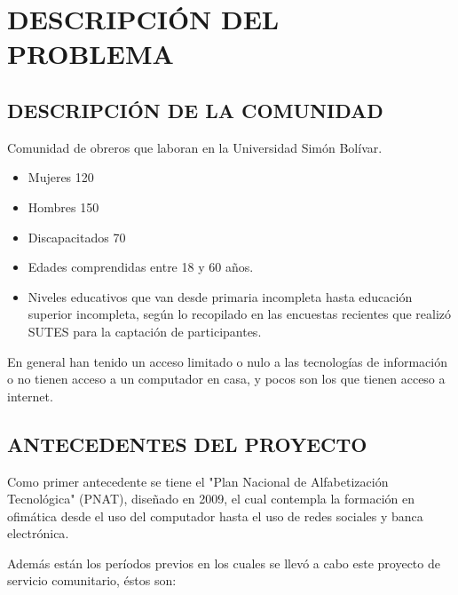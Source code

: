 	\chapter{DESCRIPCIÓN DEL PROBLEMA}
    
		\section{DESCRIPCIÓN DE LA COMUNIDAD}
			Comunidad de obreros que laboran en la Universidad Simón Bolívar. \cite{planSC}
            \begin{itemize}
                \item Mujeres 120
                \item Hombres 150
                \item Discapacitados 70
                \item Edades comprendidas entre 18 y 60 años. 
                \item Niveles educativos que van desde primaria incompleta hasta educación superior incompleta, según lo recopilado en las encuestas recientes que realizó SUTES para la captación de participantes.
            \end{itemize}
            
            En general han tenido un acceso limitado o nulo a las tecnologías de información o no tienen acceso a un computador en casa, y pocos son los que tienen acceso a internet.
            
		\section{ANTECEDENTES DEL PROYECTO}
            Como primer antecedente se tiene el "Plan Nacional de Alfabetización Tecnológica" (PNAT)\cite{PNAT}, diseñado en 2009, el cual contempla la formación en ofimática desde el  uso del computador hasta el uso de redes sociales y banca electrónica\cite{infocentro}.
            
            Además están los períodos previos en los cuales se llevó a cabo este proyecto de servicio comunitario, éstos son:
            

